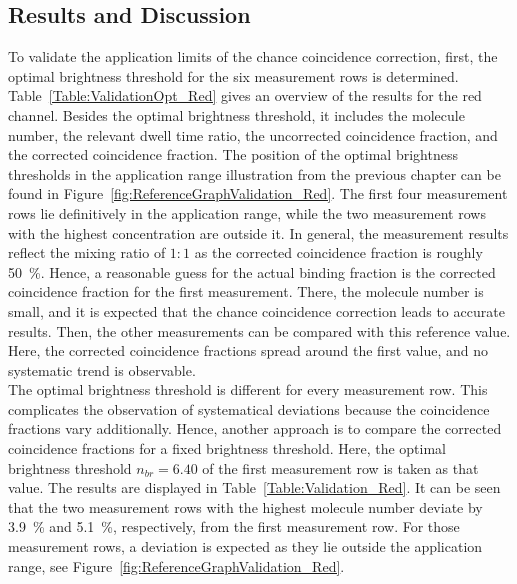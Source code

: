 \subsection{Results and Discussion}

To validate the application limits of the chance coincidence correction, first, the optimal brightness threshold for the six measurement rows is determined. Table~\ref{Table:ValidationOpt_Red} gives an overview of the results for the red channel. Besides the optimal brightness threshold, it includes the molecule number, the relevant dwell time ratio, the uncorrected coincidence fraction, and the corrected coincidence fraction. The position of the optimal brightness thresholds in the application range illustration from the previous chapter can be found in Figure~\ref{fig:ReferenceGraphValidation_Red}. The first four measurement rows lie definitively in the application range, while the two measurement rows with the highest concentration are outside it. In general, the measurement results reflect the mixing ratio of $1:1$ as the corrected coincidence fraction is roughly \SI{50}{\percent}. Hence, a reasonable guess for the actual binding fraction is the corrected coincidence fraction for the first measurement. There, the molecule number is small, and it is expected that the chance coincidence correction leads to accurate results. Then, the other measurements can be compared with this reference value. Here, the corrected coincidence fractions spread around the first value, and no systematic trend is observable. \\ 

The optimal brightness threshold is different for every measurement row. This complicates the observation of systematical deviations because the coincidence fractions vary additionally. Hence, another approach is to compare the corrected coincidence fractions for a fixed brightness threshold. Here, the optimal brightness threshold $n_{br} = \num{6.40}$ of the first measurement row is taken as that value. The results are displayed in Table~\ref{Table:Validation_Red}. It can be seen that the two measurement rows with the highest molecule number deviate by \SI{3.9}{\percent} and \SI{5.1}{\percent}, respectively, from the first measurement row. For those measurement rows, a deviation is expected as they lie outside the application range, see Figure~\ref{fig:ReferenceGraphValidation_Red}. \\

